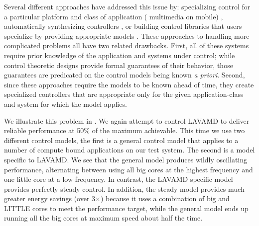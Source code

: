 Several different
approaches have addressed this issue by: specializing control for a
particular platform and class of application (\eg{} multimedia on
mobile) \cite{METE,Agilos}, automatically synthesizing controllers
\cite{torellas,FSE2015}, or building control libraries that users
specialize by providing appropriate models \cite{POET,ControlWare}. These approaches to handling more complicated problems all have two
related drawbacks.  First, all of these systems require prior
knowledge of the application and systems under control; while control
theoretic designs provide formal guarantees of their behavior, those
guarantees are predicated on the control models being known {\em a
  priori}. Second, since these approaches require the models to be
known ahead of time, they create specialized controllers that are
appropriate only for the given application-class and system for which
the model applies.  

We illustrate this problem in .  We again
attempt to control LAVAMD to deliver reliable performance at 50\% of
the maximum achievable.  This time we use two different control
models, the first is a general control model that applies to a number
of compute bound applications on our test system.  The second is a
model specific to LAVAMD.  We see that the general model produces
wildly oscillating performance, alternating between using all big
cores at the highest frequency and one little core at a low frequency.
In contrast, the LAVAMD specific model provides perfectly steady
control.  In addition, the steady model provides much greater energy
savings (over 3$\times$) because it uses a combination of big and
LITTLE cores to meet the performance target, while the general model
ends up running all the big cores at maximum speed about half the
time.

